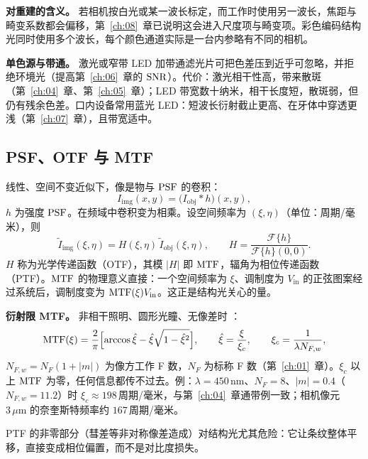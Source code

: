 \textbf{对重建的含义。} 若相机按白光或某一波长标定，而工作时使用另一波长，焦距与畸变系数都会偏移，第~\ref{ch:08}~章已说明这会进入尺度项与畸变项。彩色编码结构光同时使用多个波长，每个颜色通道实际是一台内参略有不同的相机。

\textbf{单色源与带通。} 激光或窄带 LED 加带通滤光片可把色差压到近乎可忽略，并拒绝环境光（提高第~\ref{ch:06}~章的 $\mathrm{SNR}$）。代价：激光相干性高，带来散斑（第~\ref{ch:04}~章、第~\ref{ch:05}~章）；LED 带宽数十纳米，相干长度短，散斑弱，但仍有残余色差。口内设备常用蓝光 LED：短波长衍射截止更高、在牙体中穿透更浅（第~\ref{ch:07}~章），且带宽适中。

\subsection{PSF、OTF 与 MTF}

线性、空间不变近似下，像是物与 $\mathrm{PSF}$ 的卷积：
\begin{equation}
  I_{\mathrm{img}}(x,y)=\bigl(I_{\mathrm{obj}}*h\bigr)(x,y),
  \label{eq:ch09-conv}
\end{equation}
$h$ 为强度 $\mathrm{PSF}$。在频域中卷积变为相乘。设空间频率为 $(\xi,\eta)$（单位：周期/毫米），则
\begin{equation}
  \tilde I_{\mathrm{img}}(\xi,\eta)=H(\xi,\eta)\,\tilde I_{\mathrm{obj}}(\xi,\eta),\qquad
  H=\frac{\mathcal F\{h\}}{\mathcal F\{h\}(0,0)}.
  \label{eq:ch09-otf}
\end{equation}
$H$ 称为光学传递函数（OTF），其模 $|H|$ 即 $\mathrm{MTF}$，辐角为相位传递函数（PTF）。$\mathrm{MTF}$ 的物理意义直接：一个空间频率为 $\xi$、调制度为 $V_{\mathrm{in}}$ 的正弦图案经过系统后，调制度变为 $\mathrm{MTF}(\xi)V_{\mathrm{in}}$。这正是结构光关心的量。

\textbf{衍射限 MTF。} 非相干照明、圆形光瞳、无像差时 \citep{GoodmanFourierOptics}：
\begin{equation}
  \mathrm{MTF}(\xi)=\frac{2}{\pi}\Bigl[\arccos\hat\xi-\hat\xi\sqrt{1-\hat\xi^{2}}\Bigr],\qquad
  \hat\xi=\frac{\xi}{\xi_c},\qquad \xi_c=\frac{1}{\lambda N_{F,w}},
  \label{eq:ch09-diffmtf}
\end{equation}
$N_{F,w}=N_F(1+|m|)$ 为像方工作 F 数，$N_F$ 为标称 F 数（第~\ref{ch:01}~章）。$\xi_c$ 以上 $\mathrm{MTF}$ 为零，任何信息都传不过去。例：$\lambda=450\,\mathrm{nm}$、$N_F=8$、$|m|=0.4$（$N_{F,w}=11.2$）时 $\xi_c\approx198\,$周期/毫米，与第~\ref{ch:04}~章通带例一致；相机像元 $3\,\mu\mathrm{m}$ 的奈奎斯特频率约 $167\,$周期/毫米。

PTF 的非零部分（彗差等非对称像差造成）对结构光尤其危险：它让条纹整体平移，直接变成相位偏置，而不是对比度损失。


